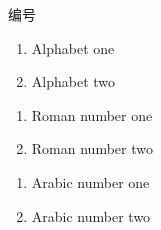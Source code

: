 \documentclass{beamer}
\begin{document}
\begin{frame}{编号}

\begin{enumerate}[label={\alph*)}]
  \item Alphabet one
  \item Alphabet two
\end{enumerate}

\begin{enumerate}[label={\roman*.}]
  \item Roman number one
  \item Roman number two
\end{enumerate}

\begin{enumerate}[label={(\arabic*)}]
  \item Arabic number one
  \item Arabic number two
\end{enumerate}
\end{frame}
\end{document}
